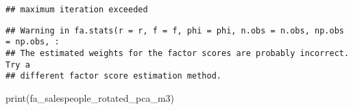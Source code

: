 \documentclass[
]{article}
\newenvironment{Shaded}{\begin{snugshade}}{\end{snugshade}}
\newcommand{\FunctionTok}[1]{\textcolor[rgb]{0.00,0.00,0.00}{#1}}
\newcommand{\NormalTok}[1]{#1}
\begin{document}
\begin{verbatim}
## maximum iteration exceeded
\end{verbatim}

\begin{verbatim}
## Warning in fa.stats(r = r, f = f, phi = phi, n.obs = n.obs, np.obs = np.obs, :
## The estimated weights for the factor scores are probably incorrect. Try a
## different factor score estimation method.
\end{verbatim}

\begin{Shaded}
\begin{Highlighting}[]
\FunctionTok{print}\NormalTok{(fa\_salespeople\_rotated\_pca\_m3)}
\end{Highlighting}
\end{Shaded}
\end{document}
